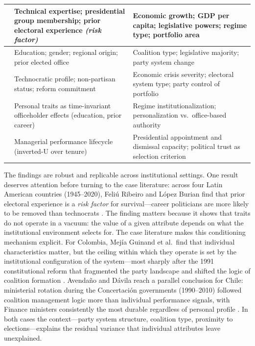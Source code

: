 \documentclass[doc, 12pt, a4paper,floatsintext]{apa7}
\begin{document}
\begin{table}[tbp]
\begin{adjustbox}{max width=\textwidth,max totalheight=.82\textheight}
\begin{tabular}{L{.27\textwidth}L{.34\textwidth}L{.34\textwidth}}
\midrule
\textcite{feliu_ribeiro_foreign_2023} & Technical expertise; presidential group membership; prior electoral experience \textit{(risk factor)} & Economic growth; GDP per capita; legislative powers; regime type; portfolio area \\
\midrule
\textcite{mejia_es_2021} & Education; gender; regional origin; prior elected office & Coalition type; legislative majority; party system change \\
\midrule
\textcite{alexiadou_commitment_2019} & Technocratic profile; non-partisan status; reform commitment & Economic crisis severity; electoral system type; party control of portfolio \\
\midrule
\textcite{baturo_office_2014} & Personal traits as time-invariant officeholder effects (education, prior career) & Regime institutionalization; personalization vs.\ office-based authority \\
\midrule
\textcite{jara_iniguez_rotacion_2019} & Managerial performance lifecycle (inverted-U over tenure) & Presidential appointment and dismissal capacity; political trust as selection criterion \\
\bottomrule
\end{tabular}
\end{adjustbox}
\end{table}

The findings are robust and replicable across institutional settings. One result 
deserves attention before turning to the case literature: across four Latin American 
countries (1945--2020), Feliú Ribeiro and López Burian find that prior electoral 
experience is a \textit{risk factor} for survival---career politicians are more likely 
to be removed than technocrats \parencite[176--177]{feliu_ribeiro_foreign_2023}. The 
finding matters because it shows that traits do not operate in a vacuum: the value of 
a given attribute depends on what the institutional environment selects for. The case 
literature makes this conditioning mechanism explicit. For Colombia, Mejía Guinand 
et al.\ find that individual characteristics matter, but the ceiling within which they 
operate is set by the institutional configuration of the system---most sharply after 
the 1991 constitutional reform that fragmented the party landscape and shifted the 
logic of coalition formation \parencite[5]{mejia_es_2021}. Avendaño and Dávila reach 
a parallel conclusion for Chile: ministerial rotation during the Concertación 
governments (1990--2010) followed coalition management logic more than individual 
performance signals, with Finance ministers consistently the most durable regardless 
of personal profile \parencite[89,101]{avendano_rotacion_2012}. In both cases the 
context---party system structure, coalition type, proximity to elections---explains 
the residual variance that individual attributes leave unexplained.
\end{document}
